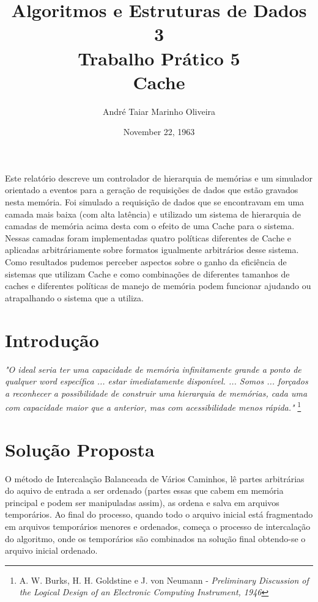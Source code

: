 \documentclass[12pt]{article}
\title{Algoritmos e Estruturas de Dados 3 \\ Trabalho Prático 5 \\
\huge{Cache}}
\date{November 22, 1963}
\author{André Taiar Marinho Oliveira}
\begin{document}
\maketitle

\begin{resumo}
Este relatório descreve um controlador de hierarquia de memórias e um simulador orientado
a eventos para a geração de requisições de dados que estão gravados nesta memória. Foi simulado 
a requisição de dados que se encontravam em uma camada mais baixa (com alta latência) e utilizado 
um sistema de hierarquia de camadas de memória acima desta com o efeito de uma Cache para o sistema. 
Nessas camadas foram implementadas quatro políticas diferentes de Cache e aplicadas arbitráriamente 
sobre formatos igualmente arbitrários desse sistema. Como resultados pudemos perceber aspectos sobre 
o ganho da eficiência de sistemas que utilizam Cache e como combinações de diferentes tamanhos de caches 
e diferentes políticas de manejo de memória podem funcionar ajudando ou atrapalhando o sistema que a 
utiliza.
\end{resumo}

\section{Introdução}
\textit{"O ideal seria ter uma capacidade de memória infinitamente grande a ponto de qualquer word
específica ... estar imediatamente disponível. ... Somos ... forçados a reconhecer a possibilidade de 
construir uma hierarquia de memórias, cada uma com capacidade maior que a anterior, mas com acessibilidade
menos rápida."} \footnote{A. W. Burks, H. H. Goldstine e J. von Neumann - \textit{Preliminary Discussion of the 
Logical Design of an Electronic Computing Instrument, 1946}}

\section{Solução Proposta}
\label{solucao_proposta}

O método de Intercalação Balanceada de Vários Caminhos, lê partes arbitrárias do 
aquivo de entrada a ser ordenado (partes essas que cabem em memória principal e 
podem ser manipuladas assim), as ordena e salva em arquivos temporários. Ao final 
do processo, quando todo o arquivo inicial está fragmentado em arquivos temporários
menores e ordenados, começa o processo de intercalação do algoritmo, onde os 
temporários são combinados na solução final obtendo-se o arquivo inicial ordenado.
\end{document}
